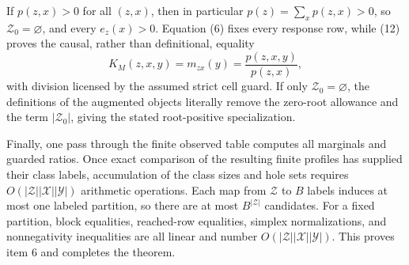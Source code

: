 If \(p(z,x)>0\) for all \((z,x)\), then in particular
\(p(z)=\sum_xp(z,x)>0\), so \(\mathcal Z_0=\varnothing\), and every
\(e_z(x)>0\).  Equation (6) fixes every response row, while (12) proves
the causal, rather than definitional, equality
\[
 K_M(z,x,y)=m_{zx}(y)=\frac{p(z,x,y)}{p(z,x)},
\]
with division licensed by the assumed strict cell guard.  If only
\(\mathcal Z_0=\varnothing\), the definitions of the augmented objects
literally remove the zero-root allowance and the term
\(|\mathcal Z_0|\), giving the stated root-positive specialization.

Finally, one pass through the finite observed table computes all
marginals and guarded ratios.  Once exact comparison of the resulting
finite profiles has supplied their class labels, accumulation of the
class sizes and hole sets requires
\(O(|\mathcal Z||\mathcal X||\mathcal Y|)\) arithmetic operations.
Each map from \(\mathcal Z\) to \(B\) labels induces at most one labeled
partition, so there are at most \(B^{|\mathcal Z|}\) candidates.  For a
fixed partition, block equalities, reached-row equalities, simplex
normalizations, and nonnegativity inequalities are all linear and number
\(O(|\mathcal Z||\mathcal X||\mathcal Y|)\).  This proves item 6 and
completes the theorem.